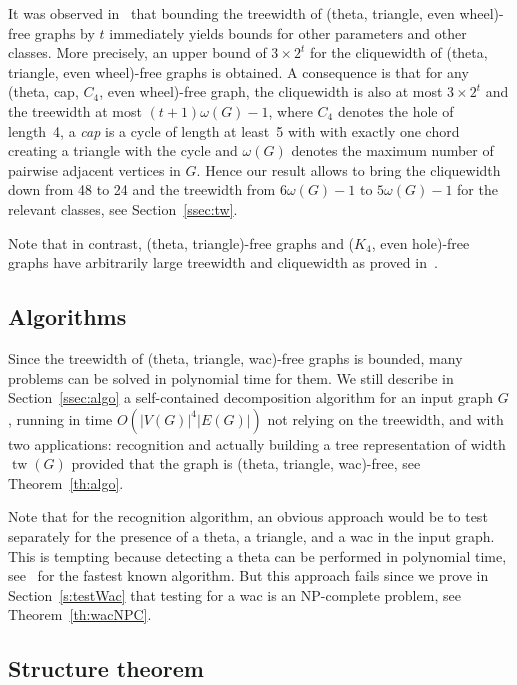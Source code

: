 \documentclass[11pt]{article}
\DeclareMathOperator{\tw}{tw}
\begin{document}
It was observed in~\cite{DBLP:journals/dm/CameronSHV18} that bounding  the treewidth of (theta, triangle, even wheel)-free graphs by $t$ immediately yields bounds for other parameters and other classes. 
More precisely, an upper bound of $3\times 2^t$ for the cliquewidth of (theta, triangle, even wheel)-free graphs is obtained. A consequence is that for any (theta, cap, $C_4$, even wheel)-free graph, the cliquewidth is also at most $3\times 2^t$ and the treewidth at most $(t+1) \omega(G) -1$,  where $C_4$ denotes the hole of length~4, a \emph{cap} is a cycle of length at least~5 with with exactly one chord creating a triangle with the cycle and $\omega(G)$ denotes the maximum number of pairwise adjacent vertices in $G$.  
Hence our result allows to bring the cliquewidth down from 48 to 24 and the treewidth from $6\omega(G) -1$ to $5\omega(G) -1$ for the relevant classes, see Section~\ref{ssec:tw}. 

Note that in contrast, (theta, triangle)-free graphs and ($K_4$, even hole)-free graphs have arbitrarily large treewidth and cliquewidth as proved in~\cite{DBLP:journals/jgt/SintiariT21}.


\subsection*{Algorithms}

Since the treewidth of (theta, triangle, wac)-free graphs is bounded, many problems can be solved in polynomial time for them. We still describe in Section~\ref{ssec:algo} a self-contained decomposition algorithm for an input graph $G$, running in time $O(|V(G)|^4|E(G)|)$ not relying on the treewidth, and with two applications: recognition and actually building a tree representation of width $\tw(G)$ provided that the graph is (theta, triangle, wac)-free, see Theorem~\ref{th:algo}.  

Note that for the recognition algorithm, an obvious approach would be to test separately for the presence of a theta, a triangle, and a wac in the input graph.  This is tempting because detecting a theta can be performed in polynomial time, see~\cite{DBLP:conf/stoc/LaiLT20} for the fastest known algorithm. But this approach fails since we prove in Section~\ref{s:testWac} that testing for a wac is an NP-complete problem, see Theorem~\ref{th:wacNPC}. 


\subsection*{Structure theorem}
\end{document}
